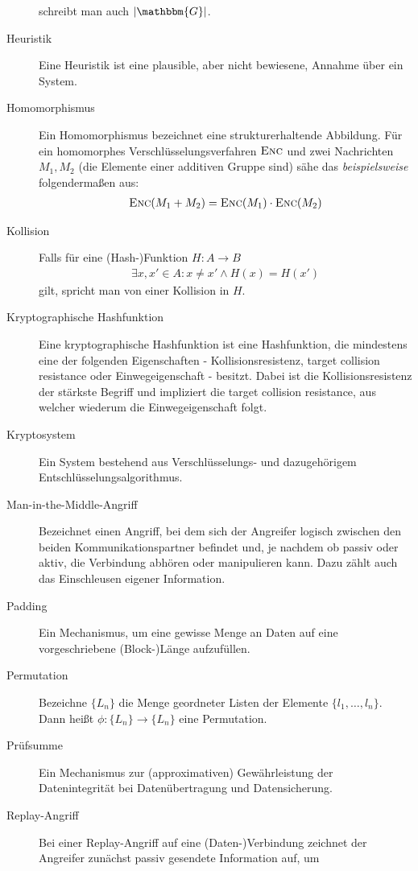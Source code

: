 \begin{description}
	schreibt man auch $\vert \mathbbm{G} \vert$.
	\item[Heuristik] Eine Heuristik ist eine plausible, aber nicht bewiesene, Annahme über ein System.
	\item[Homomorphismus] Ein Homomorphismus bezeichnet eine strukturerhaltende Abbildung. Für ein homomorphes Verschlüsselungsverfahren $\textsc{Enc}$
	und zwei Nachrichten $M_1, M_2$ (die Elemente einer additiven Gruppe sind) sähe das \emph{beispielsweise} folgendermaßen aus:
	\begin{align*}
		\textsc{Enc}(M_1 + M_2) = \textsc{Enc}(M_1) \cdot \textsc{Enc}(M_2)
	\end{align*}
	\item[Kollision] Falls für eine (Hash-)Funktion $H\colon A \rightarrow B$
	\begin{align*}
		\exists x, x' \in A : x \neq x' \land H(x) = H(x') 
	\end{align*}
	gilt, spricht man von einer Kollision in $H$.
	\item[Kryptographische Hashfunktion] Eine kryptographische Hashfunktion ist eine Hashfunktion, die mindestens eine der folgenden Eigenschaften
	- Kollisionsresistenz, target collision resistance oder Einwegeigenschaft - besitzt. Dabei ist die Kollisionsresistenz der stärkste Begriff und impliziert
	die target collision resistance, aus welcher wiederum die Einwegeigenschaft folgt.
	\item[Kryptosystem] Ein System bestehend aus Verschlüsselungs- und dazugehörigem Entschlüsselungsalgorithmus.
	\item[Man-in-the-Middle-Angriff] Bezeichnet einen Angriff, bei dem sich der Angreifer logisch zwischen den beiden Kommunikationspartner befindet und,
	je nachdem ob passiv oder aktiv, die Verbindung abhören oder manipulieren kann. Dazu zählt auch das Einschleusen eigener Information.
	\item[Padding] Ein Mechanismus, um eine gewisse Menge an Daten auf eine vorgeschriebene (Block-)Länge aufzufüllen.
	\item[Permutation] Bezeichne $\{L_n\}$ die Menge geordneter Listen der Elemente $\{l_1, \dots, l_n\}$. Dann heißt $\phi\colon \{L_n\} \rightarrow \{L_n\}$ eine Permutation.
	\item[Prüfsumme] Ein Mechanismus zur (approximativen) Gewährleistung der Datenintegrität bei Datenübertragung und Datensicherung.
	\item[Replay-Angriff] Bei einer Replay-Angriff auf eine (Daten-)Verbindung zeichnet der Angreifer zunächst passiv gesendete Information auf, um

\end{description}
